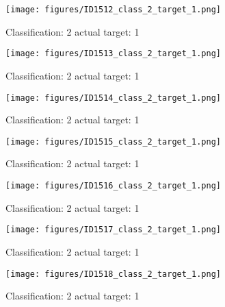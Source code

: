 \begin{figure}[h!]
\begin{center}
\texttt{[image: figures/ID1512\_class\_2\_target\_1.png]}
\end{center}
\caption{ Classification: 2 actual target: 1}
\label{fig:ID1512_class_2_target_1}
\end{figure}
\begin{figure}[h!]
\begin{center}
\texttt{[image: figures/ID1513\_class\_2\_target\_1.png]}
\end{center}
\caption{ Classification: 2 actual target: 1}
\label{fig:ID1513_class_2_target_1}
\end{figure}
\begin{figure}[h!]
\begin{center}
\texttt{[image: figures/ID1514\_class\_2\_target\_1.png]}
\end{center}
\caption{ Classification: 2 actual target: 1}
\label{fig:ID1514_class_2_target_1}
\end{figure}
\begin{figure}[h!]
\begin{center}
\texttt{[image: figures/ID1515\_class\_2\_target\_1.png]}
\end{center}
\caption{ Classification: 2 actual target: 1}
\label{fig:ID1515_class_2_target_1}
\end{figure}
\begin{figure}[h!]
\begin{center}
\texttt{[image: figures/ID1516\_class\_2\_target\_1.png]}
\end{center}
\caption{ Classification: 2 actual target: 1}
\label{fig:ID1516_class_2_target_1}
\end{figure}
\begin{figure}[h!]
\begin{center}
\texttt{[image: figures/ID1517\_class\_2\_target\_1.png]}
\end{center}
\caption{ Classification: 2 actual target: 1}
\label{fig:ID1517_class_2_target_1}
\end{figure}
\begin{figure}[h!]
\begin{center}
\texttt{[image: figures/ID1518\_class\_2\_target\_1.png]}
\end{center}
\caption{ Classification: 2 actual target: 1}
\label{fig:ID1518_class_2_target_1}
\end{figure}
